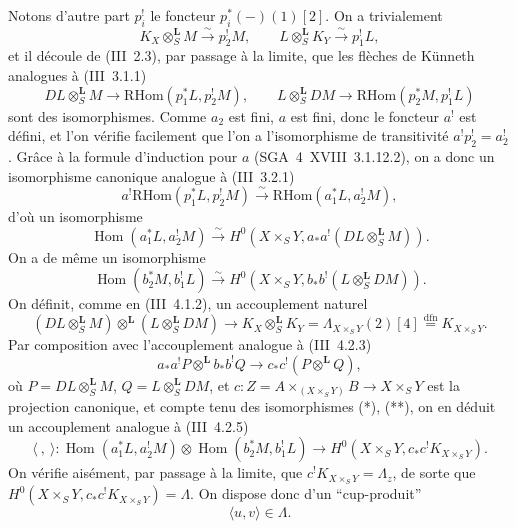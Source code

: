 \documentclass[11pt]{article}
\DeclareMathOperator{\Hom}{Hom}
\providecommand{\RHom}{\mathrm{RHom}}
\providecommand{\LL}{\mathbf L}
\providecommand{\RHom}{\mathrm{RHom}}
\providecommand{\Hom}{\operatorname{Hom}}
\providecommand{\RHom}{\mathrm R\mathcal{H}om}
\providecommand{\RHom}{\mathrm{RHom}}
\providecommand{\Hom}{\operatorname{Hom}}
\begin{document}
Notons d'autre part $p_i^!$ le foncteur $p_i^*(-)(1)[2]$. On a trivialement
\[
K_X\otimes_S^{\LL}M\xrightarrow{\sim}p_2^!M,
\qquad
L\otimes_S^{\LL}K_Y\xrightarrow{\sim}p_1^!L,
\]
et il découle de (III~2.3), par passage à la limite, que les flèches de Künneth analogues à (III~3.1.1)
\[
DL\otimes_S^{\LL}M\longrightarrow \RHom(p_1^*L,p_2^!M),
\qquad
L\otimes_S^{\LL}DM\longrightarrow \RHom(p_2^*M,p_1^!L)
\]
sont des isomorphismes. Comme $a_2$ est fini, $a$ est fini, donc le foncteur $a^!$ est défini, et l'on vérifie facilement que l'on a l'isomorphisme de transitivité $a^!p_2^!=a_2^!$. Grâce à la formule d'induction pour $a$ (SGA~4~XVIII~3.1.12.2), on a donc un isomorphisme canonique analogue à (III~3.2.1)
\[
a^!\RHom(p_1^*L,p_2^!M)\xrightarrow{\sim}\RHom(a_1^*L,a_2^!M),
\]
d'où un isomorphisme
\begin{equation}\tag{*}
\Hom(a_1^*L,a_2^!M)\xrightarrow{\sim}H^0(X\times_S Y,a_*a^!(DL\otimes_S^{\LL}M)).
\end{equation}
On a de même un isomorphisme
\begin{equation}\tag{**}
\Hom(b_2^*M,b_1^!L)\xrightarrow{\sim}H^0(X\times_S Y,b_*b^!(L\otimes_S^{\LL}DM)).
\end{equation}
On définit, comme en (III~4.1.2), un accouplement naturel
\[
(DL\otimes_S^{\LL}M)\otimes^{\LL}(L\otimes_S^{\LL}DM)
\longrightarrow K_X\otimes_S^{\LL}K_Y=\Lambda_{X\times_S Y}(2)[4]\stackrel{\mathrm{dfn}}{=}K_{X\times_S Y}.
\]
Par composition avec l'accouplement analogue à (III~4.2.3)
\[
a_*a^!P\otimes^{\LL} b_*b^!Q\longrightarrow c_*c^!(P\otimes^{\LL}Q),
\]
où $P=DL\otimes_S^{\LL}M$, $Q=L\otimes_S^{\LL}DM$, et $c:Z=A\times_{(X\times_S Y)}B\to X\times_S Y$ est la projection canonique, et compte tenu des isomorphismes (*), (**), on en déduit un accouplement analogue à (III~4.2.5)
\[
\langle\ ,\ \rangle:\Hom(a_1^*L,a_2^!M)\otimes\Hom(b_2^*M,b_1^!L)
\longrightarrow H^0(X\times_S Y,c_*c^!K_{X\times_S Y}).
\]
On vérifie aisément, par passage à la limite, que $c^!K_{X\times_S Y}=\Lambda_z$, de sorte que $H^0(X\times_S Y,c_*c^!K_{X\times_S Y})=\Lambda$. On dispose donc d'un ``cup-produit''
\begin{equation}\tag{1.1.2}
\langle u,v\rangle\in\Lambda.
\end{equation}
\end{document}
